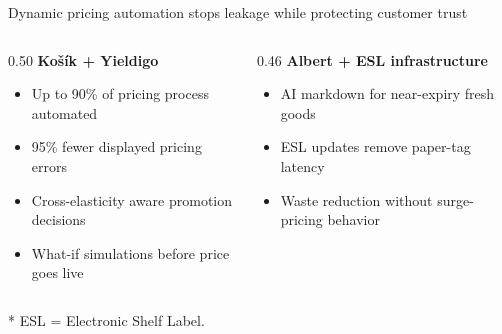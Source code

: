 \documentclass[aspectratio=169,10pt]{beamer}
\newcommand{\acronymnote}[1]{%
  \vfill
  {\raggedright\tiny\color{MutedGray}* #1\par}
}
\begin{document}
\begin{frame}{Dynamic pricing automation stops leakage while protecting customer trust}
  \begin{columns}[T,onlytextwidth]
    \begin{column}{0.50\textwidth}
      \textbf{Ko\v{s}\'ik + Yieldigo}
      \footnotesize
      \begin{itemize}\setlength\itemsep{0.55em}
        \item Up to 90\% of pricing process automated
        \item 95\% fewer displayed pricing errors
        \item Cross-elasticity aware promotion decisions
        \item What-if simulations before price goes live
      \end{itemize}
    \end{column}
    \begin{column}{0.46\textwidth}
      \textbf{Albert + ESL infrastructure}
      \footnotesize
      \begin{itemize}\setlength\itemsep{0.55em}
        \item AI markdown for near-expiry fresh goods
        \item ESL updates remove paper-tag latency
        \item Waste reduction without surge-pricing behavior
      \end{itemize}
    \end{column}
  \end{columns}
  \acronymnote{ESL = Electronic Shelf Label.}
\end{frame}
\end{document}
